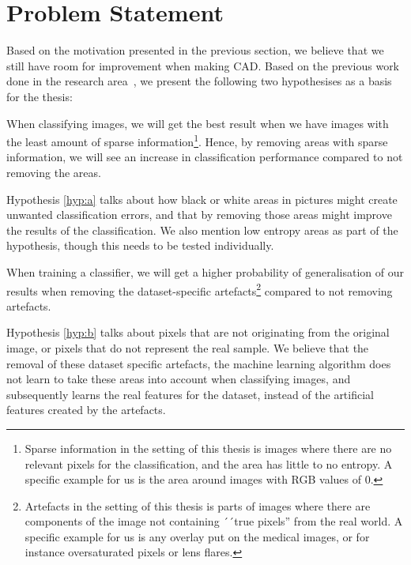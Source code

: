 \section{Problem Statement}
\label{cha:problemstatement}
Based on the motivation presented in the previous section, we believe that we still have room for improvement when making CAD. Based on the previous work done in the research area~\cite{25956,25953,riegler2016eir}, we present the following two hypothesises as a basis for the thesis:

\noindent
\begin{hyp} \label{hyp:a}
When classifying images, we will get the best result when we have images with the least amount of sparse information\footnote{Sparse information in the setting of this thesis is images where there are no relevant pixels for the classification, and the area has little to no entropy. A specific example for us is the area around images with RGB values of 0.}. 
Hence, by removing areas with sparse information,
we will see an increase in classification performance compared to not removing the areas.
\end{hyp}

\noindent
Hypothesis \ref{hyp:a} talks about how black or white areas in pictures might create unwanted classification errors, and that by removing those areas might improve the results of the classification. We also mention low entropy areas as part of the hypothesis, though this needs to be tested individually.


\noindent 
\begin{hyp} \label{hyp:b}
When training a classifier, we will get a higher probability of generalisation of our results when removing the dataset-specific artefacts\footnote{Artefacts in the setting of this thesis is parts of images where there are components of the image not containing ´´true pixels'' from the real world. A specific example for us is any overlay put on the medical images, or for instance oversaturated pixels or lens flares.} compared to not removing artefacts.
\end{hyp}

\noindent
Hypothesis \ref{hyp:b} talks about pixels that are not originating from the original image, or pixels that do not represent the real sample. We believe that the removal of these dataset specific artefacts, the machine learning algorithm does not learn to take these areas into account when classifying images, and subsequently learns the real features for the dataset, instead of the artificial features created by the artefacts.


